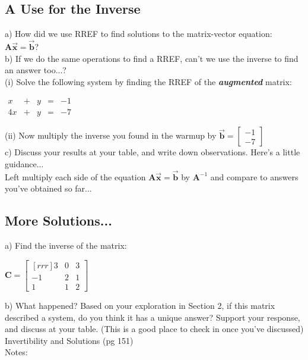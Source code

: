 \documentclass{article}
\begin{document}
\begin{flushleft}
\begin{center}
\section{A Use for the Inverse}
\end{center}
a) How did we use RREF to find solutions to the matrix-vector equation: $\textbf{A} \vec{\textbf{x}} = \vec{\textbf{b}}$?\\
\vspace{1in}
b) If we do the same operations to find a RREF, can't we use the inverse to find an answer too...?\\
(i) Solve the following system by finding the RREF of the \textbf{\textit{augmented}} matrix:\\
\begin{center}
$\begin{array}{rrrrr}
x & + & y & = & -1\\
4x & + & y & = & -7
\end{array}
$ \\ \end{center}
\vspace{2in}
(ii) Now multiply the inverse you found in the warmup by $\vec{\textbf{b}}=\begin{bmatrix} -1 \\ -7 \end{bmatrix}$ \\
\vspace{1.5in}
c) Discuss your results at your table, and write down observations. Here's a little guidance... \\
Left multiply each side of the equation $\textbf{A}\vec{\textbf{x}}=\vec{\textbf{b}}$ by $\textbf{A}^{-1}$ and compare to answers you've obtained so far...
\vspace{2in}
\newpage
\begin{center}
\section{More Solutions...}
\end{center}
a) Find the inverse of the matrix:
\begin{center}
$\textbf{C} = 
\begin{bmatrix}[rrr]
3 & 0 & 3\\
-1 & 2 & 1\\
1 & 1 & 2
\end{bmatrix}
$\\\end{center}
\vspace{2in}
b) What happened? Based on your exploration in Section 2, if this matrix described a system, do you think it has a unique answer? Support your response, and discuss at your table. (This is a good place to check in once you've discussed)\\
\vspace{2in}
\Large
Invertibility and Solutions (pg 151)\\
\normalsize
Notes:\\
\vspace{1in}
\begin{center}

\end{center}
\end{flushleft}
\end{document}
